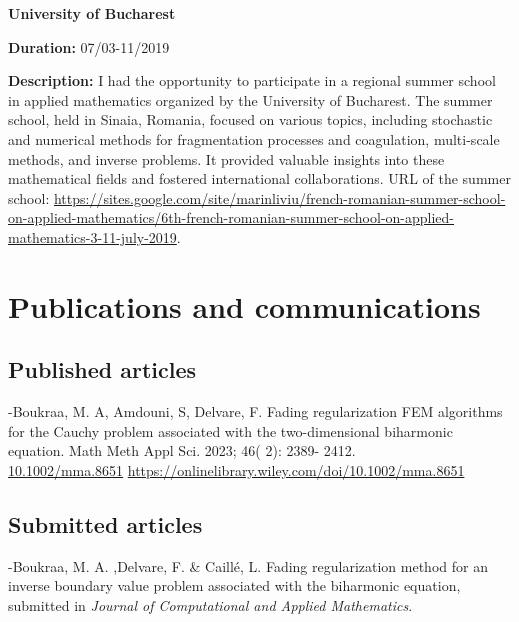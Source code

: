 \documentclass[10pt]{article} %
\begin{document}
{	\vspace{-0.15cm}\textbf{University of Bucharest}
	
	\textbf{Duration:} 07/03-11/2019
	
	\textbf{Description:} I had the opportunity to participate in a regional summer school in applied mathematics organized by the University of Bucharest. The summer school, held in Sinaia, Romania, focused on various topics, including stochastic and numerical methods for fragmentation processes and coagulation, multi-scale methods, and inverse problems. It provided valuable insights into these mathematical fields and fostered international collaborations. URL of the summer school: \href{https://sites.google.com/site/marinliviu/french-romanian-summer-school-on-applied-mathematics/6th-french-romanian-summer-school-on-applied-mathematics-3-11-july-2019}{https://sites.google.com/site/marinliviu/french-romanian-summer-school-on-applied-mathematics/6th-french-romanian-summer-school-on-applied-mathematics-3-11-july-2019}.
}





\section{Publications and communications}
\subsection{Published articles}
-Boukraa, M. A, Amdouni, S, Delvare, F. Fading regularization FEM algorithms for the Cauchy problem associated with the two-dimensional biharmonic equation. Math Meth Appl Sci. 2023; 46( 2): 2389- 2412.\\ \href{10.1002/mma.8651}{10.1002/mma.8651}
\href{https://onlinelibrary.wiley.com/doi/10.1002/mma.8651}{https://onlinelibrary.wiley.com/doi/10.1002/mma.8651}



\subsection{Submitted articles}
-Boukraa, M. A. ,Delvare, F. \& Caillé, L.   
{Fading regularization method for an inverse boundary value problem associated with the biharmonic equation,} submitted in \textit{Journal of Computational and Applied Mathematics}.
\end{document}
